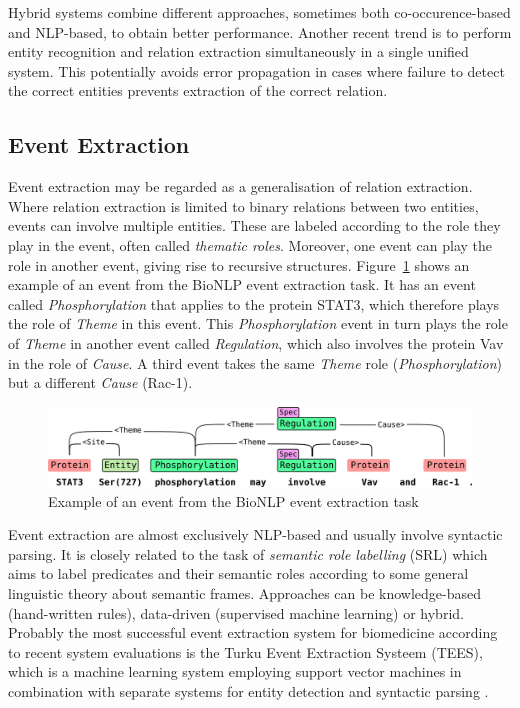 Hybrid systems combine different approaches, sometimes both co-occurence-based and NLP-based, to obtain better performance.
Another recent trend is to perform entity recognition and relation extraction simultaneously in a single unified system.
This potentially avoids error propagation in cases where failure to detect the correct entities prevents extraction of the correct relation.
  
\subsection{Event Extraction}

Event extraction may be regarded as a generalisation of relation extraction.
Where relation extraction is limited to binary relations between two entities, events can involve multiple entities.
These are labeled according to the role they play in the event, often called \emph{thematic roles}.
Moreover, one event can play the role in another event, giving rise to recursive structures.
Figure~\ref{fig:event-example} shows an example of an event from the BioNLP event extraction task.
It has an event called \emph{Phosphorylation} that applies to the protein STAT3, which therefore plays the role of \emph{Theme} in this event.
This \emph{Phosphorylation} event in turn plays the role of \emph{Theme} in another event called \emph{Regulation}, which also involves the protein Vav in the role of \emph{Cause}.
A third event takes the same \emph{Theme} role (\emph{Phosphorylation}) but a different \emph{Cause} (Rac-1).

\begin{figure}
\begin{center}
\includegraphics[scale=0.65]{figures/event-example.png}
 \caption{Example of an event from the BioNLP event extraction task \citep{Bjorne2011EXTRACTING}}
\label{fig:event-example}
\end{center}
\end{figure}

Event extraction are almost exclusively NLP-based and usually involve syntactic parsing.
It is closely related to the task of \emph{semantic role labelling} (SRL) which aims to label predicates and their semantic roles according to some general linguistic theory about semantic frames. 
Approaches can be knowledge-based (hand-written rules), data-driven (supervised machine learning) or hybrid.
Probably the most successful event extraction system for biomedicine according to recent system evaluations is the Turku Event Extraction Systeem (TEES), which is a machine learning system employing support vector machines in combination with separate systems for entity detection and syntactic parsing \citep{Bjorne2011EXTRACTING}. 

